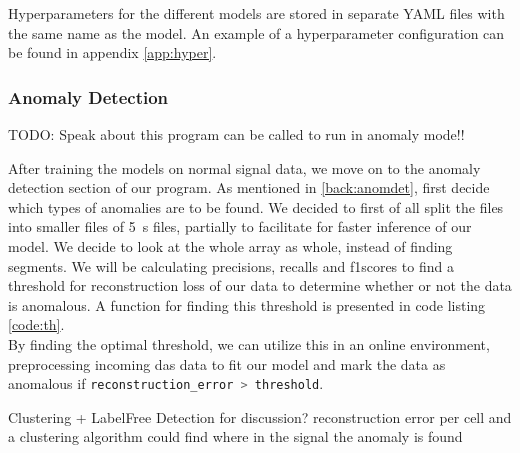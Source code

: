 Hyperparameters for the different models are stored in separate YAML files with the same name as the model. An example of a hyperparameter configuration can be found in appendix \ref{app:hyper}.


\subsubsection{Anomaly Detection}

TODO: Speak about this program can be called to run in anomaly mode!!

 
After training the models on normal signal data, we move on to the anomaly detection section of our program. As mentioned in \ref{back:anomdet}, first decide which types of anomalies are to be found. We decided to first of all split the files into smaller files of \qty{5}{\si{\second}} files, partially to facilitate for faster inference of our model. We decide to look at the whole array as whole, instead of finding segments. We will be calculating precisions, recalls and f1scores to find a threshold for reconstruction loss of our data to determine whether or not the data is anomalous. A function for finding this threshold is presented in code listing \ref{code:th}.  \\



By finding the optimal threshold, we can utilize this in an online environment, preprocessing incoming \acrshort{das} data to fit our model and mark the data as anomalous if \lstinline[language=Julia]{reconstruction_error > threshold}. 

Clustering + LabelFree Detection for discussion? reconstruction error per cell and a clustering algorithm could find where in the signal the anomaly is found

